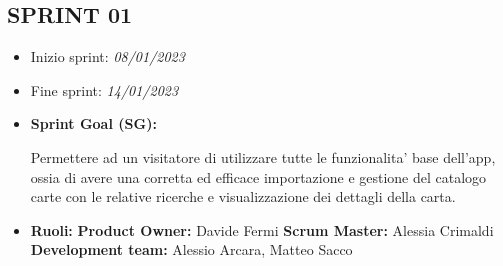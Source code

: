     \begin{landscape}

        \maketitle

        \section{SPRINT 01}

        \begin{itemize}
            \item Inizio sprint: \textit{08/01/2023}
            \item Fine sprint: \textit{14/01/2023}
        \end{itemize}

        \begin{itemize}
            \item \textbf{Sprint Goal (SG):}
            \begin{indent}
                \newline Permettere ad un visitatore di utilizzare tutte le funzionalita' base dell'app, ossia di avere una corretta ed efficace importazione e gestione del catalogo carte con le relative ricerche e visualizzazione dei dettagli della carta.
            \end{indent}
        \end{itemize}

        \begin{itemize}
            \item \textbf{Ruoli:}
            \newline \textbf{Product Owner:} Davide Fermi
            \newline \textbf{Scrum Master:} Alessia Crimaldi
            \newline \textbf{Development team:} Alessio Arcara, Matteo Sacco
        \end{itemize}
        \vspace{5mm} %

\end{landscape}
